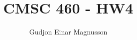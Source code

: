 \documentclass[12pt]{article}
\begin{document}
\title{CMSC 460 - HW4}
\author{Gudjon Einar Magnusson}

\maketitle

\section{}

\subsection{}

\subsection{}

\subsection{}

\subsection{}

\subsection{}

\subsection{}


\section{}


\section{} %
\end{document}

